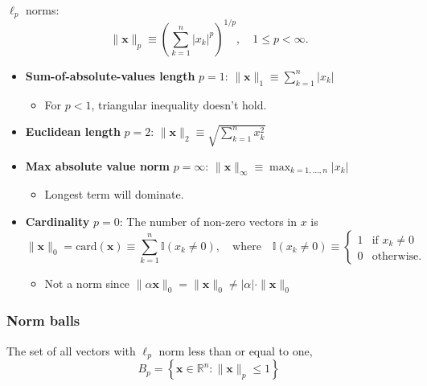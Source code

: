\begin{example}
    $\ell_p$ norms:
    \[
    \| \mathbf{x} \|_p \equiv \left( \sum_{k=1}^{n} |x_k|^p \right)^{1/p}, \quad 1 \leq p < \infty.
    \]
    \begin{itemize}
        \item \textbf{Sum-of-absolute-values length} $p=1$: $\| \mathbf{x} \|_1 \equiv \sum_{k=1}^{n} |x_k|$
        \begin{itemize}
            \item For $p<1$, triangular inequality doesn't hold.
        \end{itemize}
        \item \textbf{Euclidean length} $p=2$: $\| \mathbf{x} \|_2 \equiv \sqrt{\sum_{k=1}^{n} x_k^2}$
        \item \textbf{Max absolute value norm} $p=\infty$: $\| \mathbf{x} \|_\infty \equiv \max_{k=1,\ldots,n} |x_k|$
        \begin{itemize}
            \item Longest term will dominate.
        \end{itemize}
        \item \textbf{Cardinality} $p=0$: The number of non-zero vectors in $x$ is 
                \[
                    \| \mathbf{x} \|_0 = \text{card}(\mathbf{x}) \equiv \sum_{k=1}^{n} \mathbb{I}(x_k \neq 0), \quad \text{where} \quad \mathbb{I}(x_k \neq 0) \equiv 
                \begin{cases}
                1 & \text{if } x_k \neq 0 \\
                0 & \text{otherwise}.
                \end{cases}
                \]
        \begin{itemize}
            \item Not a norm since $ \|\alpha \mathbf{x}\|_0 = \|\mathbf{x}\|_0 \neq |\alpha| \cdot \|\mathbf{x}\|_0$
        \end{itemize}
    \end{itemize}
\end{example}

\subsubsection{Norm balls}

    \begin{definition}
        The set of all vectors with $\ell_p$ norm less than or equal to one, 
        \begin{equation}
            B_p = \left\{ \mathbf{x} \in \mathbb{R}^n : \| \mathbf{x} \|_p \leq 1 \right\}
        \end{equation}
    \end{definition}

